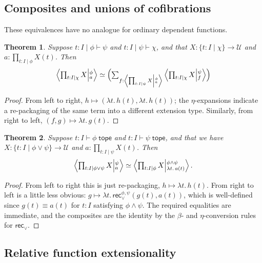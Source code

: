\documentclass[12pt]{amsart}
\theoremstyle{plain}
\newtheorem{thm}{Theorem}[section]
\theoremstyle{definition}
\theoremstyle{remark}
\numberwithin{equation}{section}
\newcommand{\tprod}{\textstyle\prod}
\newcommand{\tsum}{\textstyle\sum}
\newcommand{\exten}[4]{\left\langle\mathchoice{\textstyle\prod_{#1}}{\textstyle\prod_{#1}}{\scriptstyle\prod_{#1}}{\scriptscriptstyle\prod_{#1}} #2 \middle|^{#3}_{#4}\right\rangle}
\newcommand{\jdeq}{\equiv}
\newcommand{\types}{\vdash}
\newcommand{\univtype}{\mathcal{U}}
\newcommand{\tope}{\;\mathsf{tope}}
\newcommand{\sh}[2]{\{#1\mid #2\}}
\newcommand{\rec}{\mathsf{rec}}
\newcommand{\lam}[1]{\lambda #1.\,}
\newcommand{\Parens}[1]{\Bigl(#1\Bigr)}
\begin{document}
\subsection{Composites and unions of cofibrations}
\label{sec:compose-cofib}

These equivalences have no analogue for ordinary dependent functions.

\begin{thm}\label{thm:exten-compose}
  Suppose $t:I \mid \phi\types \psi$ and $t:I\mid \psi\types\chi$, and that $X:\sh{t:I}{\chi}\to\univtype$ and $a:\tprod_{t:I\mid\phi} X(t)$.
  Then
  \[
  \exten{t:I|\chi}{X}{\phi}{a} \simeq
  \Parens{\tsum_{f:\exten{t:I|\psi}{X}{\phi}{a}} \exten{t:I|\chi}{X}{\psi}{f}} \]
\end{thm}
\begin{proof}
  From left to right, $h\mapsto (\lam{t} h(t), \lam{t} h(t))$; the $\eta$-expansions indicate a re-packaging of the same term into a different extension type.
  Similarly, from right to left, $(f,g) \mapsto \lam{t} g(t)$.
\end{proof}

\begin{thm}\label{thm:exten-union}
  Suppose $t:I \types \phi\tope$ and $t:I \types \psi\tope$, and that we have $X:\sh{t:I}{\phi\lor\psi}\to\univtype$ and $a:\tprod_{t:I\mid\psi} X(t)$.
  Then
  \[ \exten{t:I|\phi\lor\psi}{X}{\psi}{a} \simeq
  \exten{t:I|\phi}{X}{\phi\land\psi}{\lam{t}a(t)}.
  \]
\end{thm}
\begin{proof}
  From left to right this is just re-packaging, $h\mapsto \lam{t} h(t)$.
  From right to left is a little less obvious: $g \mapsto \lam{t} \rec_\lor^{\phi,\psi}(g(t),a(t))$, which is well-defined since $g(t)\jdeq a(t)$ {for $t:I$ satisfying $\phi\land\psi$.}
  The required equalities are immediate, and the composites are the identity by the $\beta$- and $\eta$-conversion rules for $\rec_\lor$.
\end{proof}


\subsection{Relative function extensionality}
\label{sec:funext}
\end{document}

